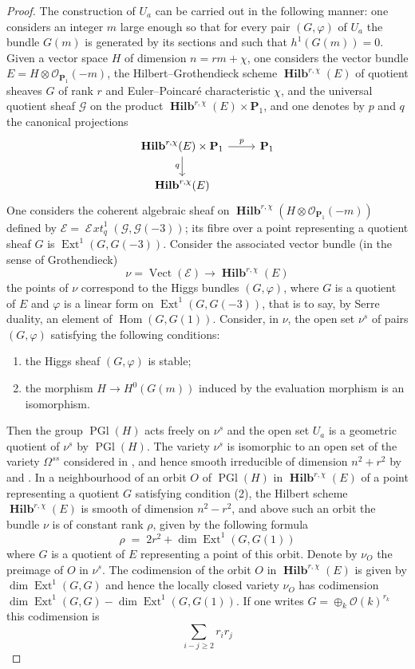 \documentclass[12pt,english]{smfart}%
\theoremstyle{plain}
\theoremstyle{definition}
\theoremstyle{remark}
\newcommand{\PP}{\mathbf{P}}
\newcommand{\Oh}{\mathcal{O}}
\DeclareMathOperator{\Hom}{Hom}
\DeclareMathOperator{\Ext}{Ext}
\DeclareMathOperator{\Vect}{Vect}
\DeclareMathOperator{\PGl}{PGl}
\DeclareMathOperator{\Hilb}{\mathbf{Hilb}}
\newcommand{\Extsh}{\mathop{\mathcal{E}\!\mathit{xt}}\nolimits}
\newcommand{\origpage}[1]{\marginnote{\scriptsize\itshape p.~#1}}
\begin{document}
\begin{proof}
The construction of $U_{a}$ can be carried out in the following manner: one considers an integer $m$ large enough so that for every pair $(G,\varphi)$ of $U_{a}$ the bundle $G(m)$ is generated by its sections and such that $h^{1}(G(m))=0$. Given a vector space $H$ of dimension $n=rm+\chi$, one considers the vector bundle $E=H\otimes\Oh_{\PP_{1}}(-m)$, the Hilbert--Grothendieck scheme $\Hilb^{r,\chi}(E)$ of quotient sheaves $G$ of rank $r$ and Euler--Poincar\'e characteristic $\chi$, and the universal quotient sheaf $\mathscr{G}$ on the product $\Hilb^{r,\chi}(E)\times\PP_{1}$, and one denotes by $p$ and $q$ the canonical projections
\[
\begin{tikzcd}
\Hilb^{r,\chi}(E)\times\PP_{1} \arrow[r,"p"] \arrow[d,"q"'] & \PP_{1} \\
\Hilb^{r,\chi}(E) &
\end{tikzcd}
\]
One considers the coherent algebraic sheaf on $\Hilb^{r,\chi}(H\otimes\Oh_{\PP_{1}}(-m))$ defined by $\mathscr{E}=\Extsh^{1}_{q}(\mathscr{G},\mathscr{G}(-3))$; its fibre over a point representing a quotient sheaf $G$ is $\Ext^{1}(G,G(-3))$. Consider the associated vector bundle (in the sense of Grothendieck)
\[
\nu = \Vect(\mathscr{E}) \longrightarrow \Hilb^{r,\chi}(E)
\]
the points of $\nu$ correspond to the Higgs bundles $(G,\varphi)$, where $G$ is a quotient of $E$ and $\varphi$ is a linear form on $\Ext^{1}(G,G(-3))$, that is to say, by Serre duality, an element of $\Hom(G,G(1))$. Consider, in $\nu$, the open set $\nu^{s}$ of pairs $(G,\varphi)$ satisfying the following conditions:
\begin{enumerate}
\item[(1)] the Higgs sheaf $(G,\varphi)$ is stable;
\item[(2)] the morphism $H\to H^{0}(G(m))$ induced by the evaluation morphism is an isomorphism.
\end{enumerate}
Then the group $\PGl(H)$ acts freely on $\nu^{s}$ and the open set $U_{a}$ is a geometric quotient of $\nu^{s}$ by $\PGl(H)$. The variety $\nu^{s}$ is isomorphic to an open set of the variety $\Omega^{ss}$ considered in , and hence smooth irreducible of dimension $n^{2}+r^{2}$ by  and . In a neighbourhood of an orbit $O$ of $\PGl(H)$ in $\Hilb^{r,\chi}(E)$ of a point representing a quotient $G$ satisfying condition (2), the Hilbert scheme $\Hilb^{r,\chi}(E)$ is smooth of dimension $n^{2}-r^{2}$, and above such an orbit the bundle $\nu$ is of constant rank $\rho$, given by the following formula
\[
\rho \;=\; 2r^{2} + \dim\Ext^{1}(G,G(1))
\]
where $G$ is a quotient of $E$ representing a point of this orbit. Denote by $\nu_{O}$ the preimage of $O$ in $\nu^{s}$. The codimension of the orbit $O$ in $\Hilb^{r,\chi}(E)$ is given by $\dim\Ext^{1}(G,G)$ and hence the locally
\origpage{650}%
closed variety $\nu_{O}$ has codimension $\dim\Ext^{1}(G,G)-\dim\Ext^{1}(G,G(1))$. If one writes $G=\oplus_{k}\Oh(k)^{r_{k}}$ this codimension is
\[
\sum_{i-j\geq 2} r_{i} r_{j}
\]


\end{proof}
\end{document}

